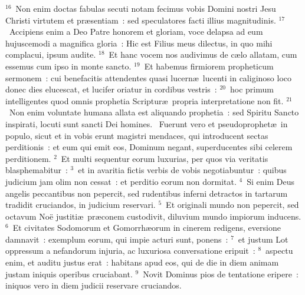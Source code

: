 ${}^{16}$~Non enim doctas fabulas secuti notam fecimus vobis Domini nostri Jesu Christi virtutem et pr\ae sentiam~: sed speculatores facti illius magnitudinis.
${}^{17}$~Accipiens enim a Deo Patre honorem et gloriam, voce delapsa ad eum hujuscemodi a magnifica gloria~: Hic est Filius meus dilectus, in quo mihi complacui, ipsum audite.
${}^{18}$~Et hanc vocem nos audivimus de c\ae lo allatam, cum essemus cum ipso in monte sancto.
${}^{19}$~Et habemus firmiorem propheticum sermonem~: cui benefacitis attendentes quasi lucern\ae\ lucenti in caliginoso loco donec dies elucescat, et lucifer oriatur in cordibus vestris~:
${}^{20}$~hoc primum intelligentes quod omnis prophetia Scriptur\ae\ propria interpretatione non fit.
${}^{21}$~Non enim voluntate humana allata est aliquando prophetia~: sed Spiritu Sancto inspirati, locuti sunt sancti Dei homines.
~Fuerunt vero et pseudoprophet\ae\ in populo, sicut et in vobis erunt magistri mendaces, qui introducent sectas perditionis~: et eum qui emit eos, Dominum negant, superducentes sibi celerem perditionem.
${}^{2}$~Et multi sequentur eorum luxurias, per quos via veritatis blasphemabitur~:
${}^{3}$~et in avaritia fictis verbis de vobis negotiabuntur~: quibus judicium jam olim non cessat~: et perditio eorum non dormitat.
${}^{4}$~Si enim Deus angelis peccantibus non pepercit, sed rudentibus inferni detractos in tartarum tradidit cruciandos, in judicium reservari.
${}^{5}$~Et originali mundo non pepercit, sed octavum No\"e justiti\ae\ pr\ae conem custodivit, diluvium mundo impiorum inducens.
${}^{6}$~Et civitates Sodomorum et Gomorrh\ae orum in cinerem redigens, eversione damnavit~: exemplum eorum, qui impie acturi sunt, ponens~:
${}^{7}$~et justum Lot oppressum a nefandorum injuria, ac luxuriosa conversatione eripuit~:
${}^{8}$~aspectu enim, et auditu justus erat~: habitans apud eos, qui de die in diem animam justam iniquis operibus cruciabant.
${}^{9}$~Novit Dominus pios de tentatione eripere~: iniquos vero in diem judicii reservare cruciandos.


